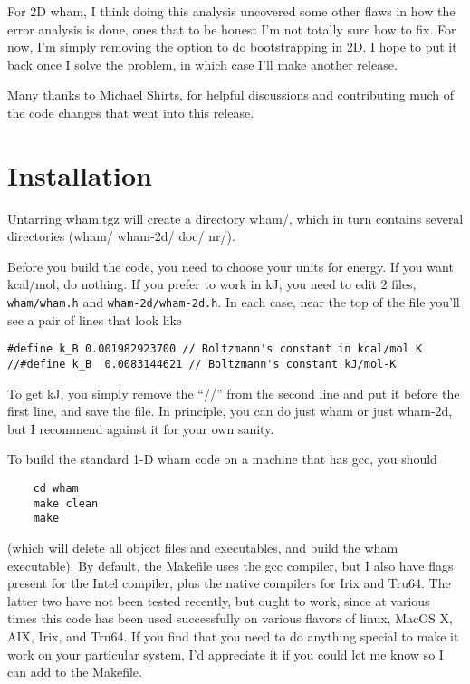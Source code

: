 \documentclass[12pt]{article}
\begin{document}
For 2D wham, I think doing this analysis uncovered some other flaws in how the
error analysis is done, ones that to be honest I'm not totally sure how to
fix.  For now, I'm simply removing the option to do bootstrapping in 2D.  I
hope to put it back once I solve the problem, in which case I'll make another
release.

Many thanks to Michael Shirts, for helpful discussions and contributing much
of the code changes that went into this release.

\section{Installation}

Untarring wham.tgz will create a directory wham/, which in turn contains
several directories (wham/ wham-2d/ doc/ nr/).

Before you build the code, you need to choose your units for energy.  If you
want kcal/mol, do nothing.  If you prefer to work in kJ, you need to edit
2 files, {\tt wham/wham.h} and {\tt wham-2d/wham-2d.h}.  In each case, near the
top of the file you'll see a pair of lines that look like

\begin{verbatim}
#define k_B 0.001982923700 // Boltzmann's constant in kcal/mol K
//#define k_B  0.0083144621 // Boltzmann's constant kJ/mol-K
\end{verbatim}

To get kJ, you simply remove the ``//'' from the second line and put it
before the first line, and save the file.  In principle, you can do just wham
or just wham-2d, but I recommend against it for your own sanity.

To build the standard 1-D wham code on a machine that has gcc, you should

\begin{verbatim}
    cd wham
    make clean
    make
\end{verbatim}

(which will delete all object files and executables, and build the wham
executable).  By default, the Makefile uses the gcc compiler, but I also have
flags present for the Intel compiler, plus the native compilers for Irix and
Tru64.  The latter two have not been tested recently, but ought to work,
since at various times this code has been used successfully on various
flavors of linux, MacOS X, AIX, Irix, and Tru64.  If you find that you need
to do anything special to make it work on your particular system, I'd
appreciate it if you could let me know so I can add to the Makefile.
\end{document}
